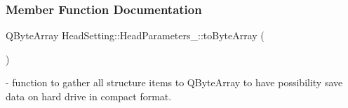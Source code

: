 \subsubsection{Member Function Documentation}
\mbox{\label{structHeadSetting_1_1HeadParameters___aaf3a8c897bc5b98a9f174e9b605afe27}} 
{\footnotesize\ttfamily Q\+Byte\+Array Head\+Setting\+::\+Head\+Parameters\+\_\+\+::\texorpdfstring{to\+Byte\+Array}{toByteArray} (\begin{DoxyParamCaption}{ }\end{DoxyParamCaption})} - function to gather all structure items to \mbox{Q\+Byte\+Array} to have possibility save data on hard drive in compact format.

